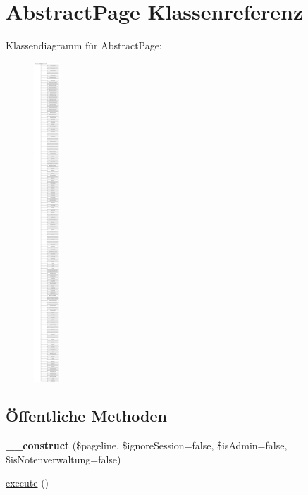 \hypertarget{class_abstract_page}{}\section{Abstract\+Page Klassenreferenz}
\label{class_abstract_page}
Klassendiagramm für Abstract\+Page\+:\begin{figure}[H]
\begin{center}
\leavevmode
\includegraphics[height=12.000000cm]{class_abstract_page}
\end{center}
\end{figure}
\subsection*{Öffentliche Methoden}
\begin{DoxyCompactItemize}
\item 
\mbox{\label{class_abstract_page_a32769f81bf1c7f2e3df37cd6b457382c}} 
{\bfseries \+\_\+\+\_\+construct} (\$pageline, \$ignore\+Session=false, \$is\+Admin=false, \$is\+Notenverwaltung=false)
\item 
\mbox{\hyperlink{class_abstract_page_af8acacdd4a33f97087ef25a8771ecd9c}{execute}} ()
\end{DoxyCompactItemize}
